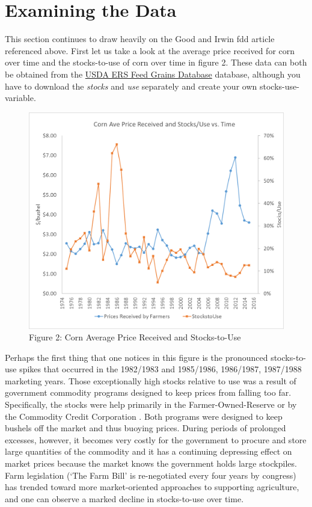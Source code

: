 \documentclass[]{book}
\theoremstyle{definition}
\theoremstyle{definition}
\theoremstyle{remark}
\begin{document}
\section{Examining the Data}\label{examining-the-data}

This section continues to draw heavily on the Good and Irwin fdd article
referenced above. First let us take a look at the average price received
for corn over time and the stocks-to-use of corn over time in figure 2.
These data can both be obtained from the
\href{http://www.ers.usda.gov/data-products/feed-grains-database.aspx}{USDA
ERS Feed Grains Database} database, although you have to download the
\emph{stocks} and \emph{use} separately and create your own
stocks-use-variable.

\begin{figure}[htbp]
\centering
\includegraphics{Excel-files/EndingStocksand-corn_endingstock_prices_files/image005.png}
\caption{Figure 2: Corn Average Price Received and Stocks-to-Use}
\end{figure}

Perhaps the first thing that one notices in this figure is the
pronounced stocks-to-use spikes that occurred in the 1982/1983 and
1985/1986, 1986/1987, 1987/1988 marketing years. Those exceptionally
high stocks relative to use was a result of government commodity
programs designed to keep prices from falling too far. Specifically, the
stocks were help primarily in the Farmer-Owned-Reserve or by the
Commodity Credit Corporation \citep{westcott1999price}. Both programs
were designed to keep bushels off the market and thus buoying prices.
During periods of prolonged excesses, however, it becomes very costly
for the government to procure and store large quantities of the
commodity and it has a continuing depressing effect on market prices
because the market knows the government holds large stockpiles. Farm
legislation (`The Farm Bill' is re-negotiated every four years by
congress) has trended toward more market-oriented approaches to
supporting agriculture, and one can observe a marked decline in
stocks-to-use over time.
\end{document}

